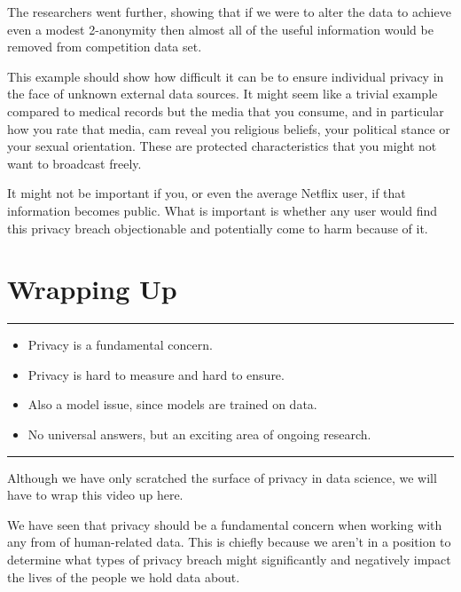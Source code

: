 \documentclass[
  12pt,
]{book}
\providecommand{\tightlist}{%
  \setlength{\itemsep}{0pt}\setlength{\parskip}{0pt}}
\begin{document}
The researchers went further, showing that if we were to alter the data to achieve even a modest 2-anonymity then almost all of the useful information would be removed from competition data set.

This example should show how difficult it can be to ensure individual privacy in the face of unknown external data sources. It might seem like a trivial example compared to medical records but the media that you consume, and in particular how you rate that media, cam reveal you religious beliefs, your political stance or your sexual orientation. These are protected characteristics that you might not want to broadcast freely.

It might not be important if you, or even the average Netflix user, if that information becomes public. What is important is whether any user would find this privacy breach objectionable and potentially come to harm because of it.

\hypertarget{wrapping-up-8}{%
\section{Wrapping Up}\label{wrapping-up-8}}

\begin{center}\rule{0.5\linewidth}{0.5pt}\end{center}

\begin{itemize}
\tightlist
\item
  Privacy is a fundamental concern.
\item
  Privacy is hard to measure and hard to ensure.
\item
  Also a model issue, since models are trained on data.
\item
  No universal answers, but an exciting area of ongoing research.
\end{itemize}

\begin{center}\rule{0.5\linewidth}{0.5pt}\end{center}

Although we have only scratched the surface of privacy in data science, we will have to wrap this video up here.

We have seen that privacy should be a fundamental concern when working with any from of human-related data. This is chiefly because we aren't in a position to determine what types of privacy breach might significantly and negatively impact the lives of the people we hold data about.
\end{document}
